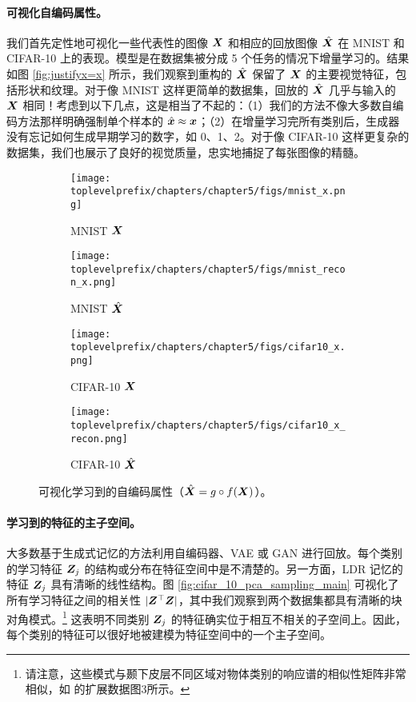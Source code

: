 \documentclass[../../book-main.tex]{subfiles}
\begin{document}
\paragraph{可视化自编码属性。}
我们首先定性地可视化一些代表性的图像 $\bm{X}$ 和相应的回放图像 $\hat{\bm{X}}$ 在 MNIST 和 CIFAR-10 上的表现。模型是在数据集被分成 5 个任务的情况下增量学习的。结果如图 \ref{fig:justifyx=x} 所示，我们观察到重构的 $\hat{\bm{X}}$ 保留了 $\bm{X}$ 的主要视觉特征，包括形状和纹理。对于像 MNIST 这样更简单的数据集，回放的 $\hat{\bm{X}}$ 几乎与输入的 $\bm{X}$ 相同！考虑到以下几点，这是相当了不起的：（1）我们的方法不像大多数自编码方法那样明确强制单个样本的 $\hat{\bm{x}} \approx \bm{x}$；（2）在增量学习完所有类别后，生成器没有忘记如何生成早期学习的数字，如 0、1、2。对于像 CIFAR-10 这样更复杂的数据集，我们也展示了良好的视觉质量，忠实地捕捉了每张图像的精髓。

\begin{figure}[t]
    \begin{subfigure}[t]{0.20\textwidth}
        \centering
        \texttt{[image: \\toplevelprefix/chapters/chapter5/figs/mnist\_x.png]}
        \caption{MNIST $\bm{X}$}
    \end{subfigure}
    \hfill
    \begin{subfigure}[t]{0.20\textwidth}
        \centering
        \texttt{[image: \\toplevelprefix/chapters/chapter5/figs/mnist\_recon\_x.png]}
        \caption{MNIST $\hat{\bm{X}}$}
    \end{subfigure}
    \hfill
    \begin{subfigure}[t]{0.20\textwidth}
        \centering
        \texttt{[image: \\toplevelprefix/chapters/chapter5/figs/cifar10\_x.png]}
        \caption{CIFAR-10 $\bm{X}$}
    \end{subfigure}
    \hfill
    \begin{subfigure}[t]{0.20\textwidth}
        \centering
        \texttt{[image: \\toplevelprefix/chapters/chapter5/figs/cifar10\_x\_recon.png]}
        \caption{CIFAR-10 $\hat{\bm{X}}$}
    \end{subfigure}
    \caption{\small 可视化学习到的自编码属性（$\hat{\bm{X}} = g\circ f(\bm{X})$）。}
\end{figure}


\paragraph{学习到的特征的主子空间。}
大多数基于生成式记忆的方法利用自编码器、VAE 或 GAN 进行回放。每个类别的学习特征 $\bm{Z}_j$ 的结构或分布在特征空间中是不清楚的。另一方面，LDR 记忆的特征 $\bm{Z}_j$ 具有清晰的线性结构。图 \ref{fig:cifar_10_pca_sampling_main} 可视化了所有学习特征之间的相关性 $|\bm{Z}^\top\bm{Z}|$，其中我们观察到两个数据集都具有清晰的块对角模式。\footnote{请注意，这些模式与颞下皮层不同区域对物体类别的响应谱的相似性矩阵非常相似，如 \cite{Bao2020AMO} 的扩展数据图3所示。} 这表明不同类别 $\bm{Z}_j$ 的特征确实位于相互不相关的子空间上。因此，每个类别的特征可以很好地被建模为特征空间中的一个主子空间。%
\end{document}
